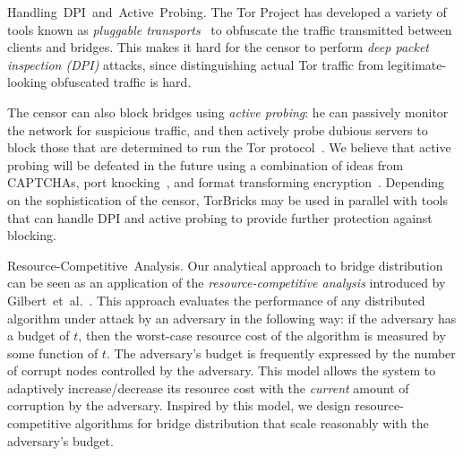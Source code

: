 \documentclass{sig-alternate-05-2015}
\newcommand{\etal}{et~al.}
\newcommand{\bricks}{}
\def\bricks/{\mbox{TorBricks}}
\newcommand{\sfsize}{\fontsize{0.8\baselineskip}{0.68\baselineskip}\selectfont}
\newcommand{\sans}[1]{\textsf{\sfsize \mbox{#1}}}
\newcommand{\para}[1]{\vspace{0.55em} \noindent \sans{{\mbox{#1}}}}
\begin{document}
\para{Handling DPI and Active Probing.} The Tor Project has developed a variety of tools known as \emph{pluggable transports}~\cite{Tor:PluggableTransport} to obfuscate the traffic transmitted between clients and bridges. This makes it hard for the censor to perform \emph{deep packet inspection (DPI)} attacks, since distinguishing actual Tor traffic from legitimate-looking obfuscated traffic is hard.

The censor can also block bridges using \emph{active probing}: he can passively monitor the network for suspicious traffic, and then actively probe dubious servers to block those that are determined to run the Tor protocol~\cite{Ensafi2015b}.
We believe that active probing will be defeated in the future using a combination of ideas from CAPTCHAs, port knocking~\cite{PortKnocking2003}, and format transforming encryption~\cite{Dyer:2013:PMM:2508859.2516657}.
Depending on the sophistication of the censor, \bricks/ may be used in parallel with tools that can handle DPI and active probing to provide further protection against blocking.



\para{Resource-Competitive Analysis.} Our analytical approach to bridge distribution can be seen as an application of the \emph{resource-competitive analysis} introduced by Gilbert~\etal~\cite{Gilbert:2012:RAN:2335470.2335471,Bender:2015:SIGACT}. This approach evaluates the performance of any distributed algorithm under attack by an adversary in the following way: if the adversary has a budget of $t$, then the worst-case resource cost of the algorithm is measured by some function of $t$. The adversary's budget is frequently expressed by the number of corrupt nodes controlled by the adversary. This model allows the system to adaptively increase/decrease its resource cost with the \emph{current} amount of corruption by the adversary. Inspired by this model, we design resource-competitive algorithms for bridge distribution that scale reasonably with the adversary's budget.
\end{document}
